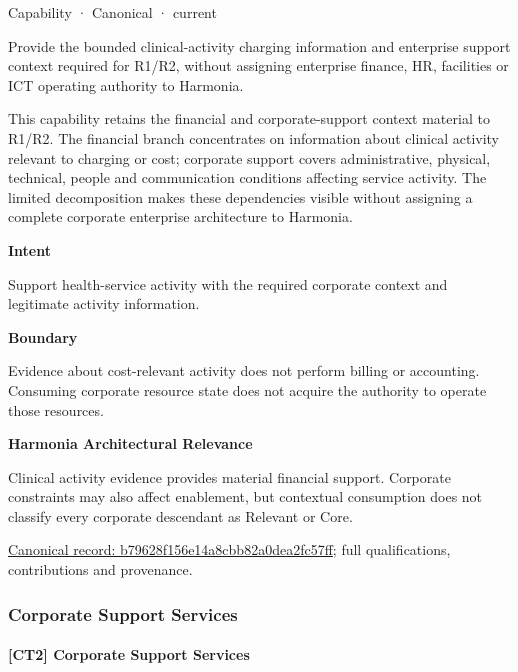 \label{element:b79628f156e14a8cbb82a0dea2fc57ff}
{\small Capability · Canonical · current}\par

Provide the bounded clinical-activity charging information and enterprise support context required for R1/R2, without assigning enterprise finance, HR, facilities or ICT operating authority to Harmonia.



This capability retains the financial and corporate-support context material to R1/R2. The financial branch concentrates on information about clinical activity relevant to charging or cost; corporate support covers administrative, physical, technical, people and communication conditions affecting service activity. The limited decomposition makes these dependencies visible without assigning a complete corporate enterprise architecture to Harmonia.



\textbf{Intent}



Support health-service activity with the required corporate context and legitimate activity information.



\textbf{Boundary}



Evidence about cost-relevant activity does not perform billing or accounting. Consuming corporate resource state does not acquire the authority to operate those resources.



\textbf{Harmonia Architectural Relevance}



Clinical activity evidence provides material financial support. Corporate constraints may also affect enablement, but contextual consumption does not classify every corporate descendant as Relevant or Core.


{\footnotesize \href{../../../../continuum/strategy/capability/b79628f156e14a8cbb82a0dea2fc57ff.md}{Canonical record: b79628f156e14a8cbb82a0dea2fc57ff}; full qualifications, contributions and provenance.}\par
\subsubsection{Corporate Support Services}

\paragraph{[CT2] Corporate Support Services}

